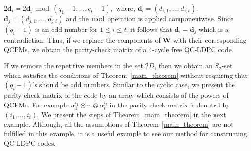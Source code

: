 \documentclass[journal,draftclsnofoot,onecolumn,12pt,twoside]{IEEEtran}
\begin{document}
\begin{IEEEproof}
$
  2\mathbf{d}_i = 2\mathbf{d}_j \bmod (q_1-1,\ldots, q_t-1),$
where, $\mathbf{d}_i=(d_{i,1},\ldots,d_{i,t})$, $\mathbf{d}_j=(d_{j,1},\ldots,d_{j,t})$ and the $\bmod$ operation is applied componentwise. Since $(q_i-1)$ is an odd number for $1\leq i\leq t$,  it follows that $\mathbf{d}_i=\mathbf{d}_j$ which is a contradiction.
Thus, if we replace the components of $\mathbf{W}$  with their corresponding QCPMs, we obtain the parity-check matrix of a $4$-cycle free QC-LDPC code.
\end{IEEEproof}


If we remove the repetitive members in the set $2D$, then we obtain an $S_2$-set which satisfies the conditions of Theorem~\ref{main_theorem} without requiring that $(q_i-1)$'s should be odd numbers.
Similar to the cyclic case, we present the parity-check matrix of the code by an array which consists of the powers of QCPMs. For example $\alpha_1^{i_1}\otimes \cdots \otimes \alpha_t^{i_t}$ in the parity-check matrix is denoted by $(i_1,\ldots,i_t)$. We present the steps of Theorem~\ref{main_theorem} in the next example. Although, all the assumptions of Theorem~\ref{main_theorem} are not fulfilled in this example, it is a useful example to see our method for constructing QC-LDPC codes.
\end{document}
